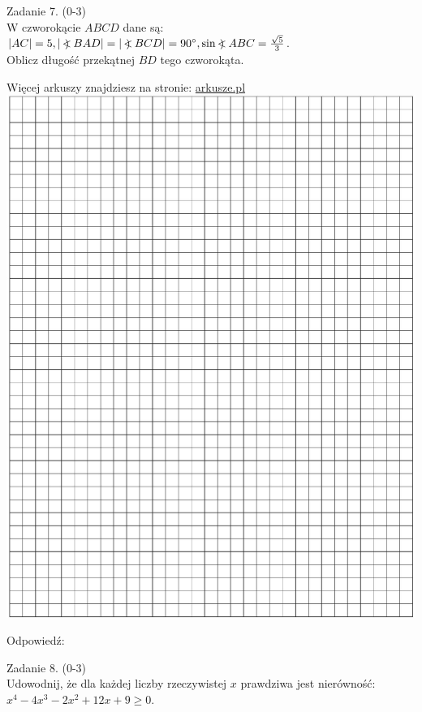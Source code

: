 \documentclass[10pt]{article}
\newcommand\Varangle{\mathop{{<\!\!\!\!\!\text{\small)}}\:}\nolimits}
\begin{document}
Zadanie 7. (0-3)\\
W czworokącie \(A B C D\) dane są: \(|A C|=5,|\Varangle B A D|=|\Varangle B C D|=90^{\circ}, \sin \Varangle A B C=\frac{\sqrt{5}}{3}\).\\
Oblicz długość przekątnej \(B D\) tego czworokąta.

Więcej arkuszy znajdziesz na stronie: \href{http://arkusze.pl}{arkusze.pl}\\
\includegraphics[max width=\textwidth, center]{2024_11_21_a7a52c0c0974ad42b88bg-04}

Odpowiedź:

Zadanie 8. (0-3)\\
Udowodnij, że dla każdej liczby rzeczywistej \(x\) prawdziwa jest nierówność:\\
\(x^{4}-4 x^{3}-2 x^{2}+12 x+9 \geqslant 0\).
\end{document}
